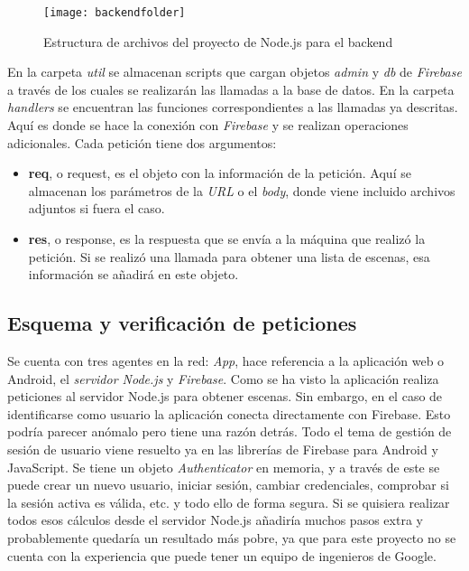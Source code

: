 \begin{figure}[h]
    \centering
    \texttt{[image: backendfolder]}
    \caption[Estructura de archivos de backend]{Estructura de archivos del proyecto de Node.js para el backend}
\end{figure}

En la carpeta \textit{util} se almacenan scripts que cargan objetos \textit{admin} y \textit{db} de \textit{Firebase} a través de los cuales se realizarán las llamadas a la base de datos. En la carpeta \textit{handlers} se encuentran las funciones correspondientes a las llamadas ya descritas. Aquí es donde se hace la conexión con \textit{Firebase} y se realizan operaciones adicionales. Cada petición tiene dos argumentos:

\begin{itemize}
    \item \textbf{req}, o request, es el objeto con la información de la petición. Aquí se almacenan los parámetros de la \textit{URL} o el \textit{body}, donde viene incluido archivos adjuntos si fuera el caso.
    \item \textbf{res}, o response, es la respuesta que se envía a la máquina que realizó la petición. Si se realizó una llamada para obtener una lista de escenas, esa información se añadirá en este objeto.
\end{itemize}

\subsection{Esquema y verificación de peticiones}

Se cuenta con tres agentes en la red: \textit{App}, hace referencia a la aplicación web o Android, el \textit{servidor Node.js} y \textit{Firebase}. Como se ha visto la aplicación realiza peticiones al servidor Node.js para obtener escenas. Sin embargo, en el caso de identificarse como usuario la aplicación conecta directamente con Firebase. Esto podría parecer anómalo pero tiene una razón detrás. Todo el tema de gestión de sesión de usuario viene resuelto ya en las librerías de Firebase para Android y JavaScript. Se tiene un objeto \textit{Authenticator} en memoria, y a través de este se puede crear un nuevo usuario, iniciar sesión, cambiar credenciales, comprobar si la sesión activa es válida, etc. y todo ello de forma segura. Si se quisiera realizar todos esos cálculos desde el servidor Node.js añadiría muchos pasos extra y probablemente quedaría un resultado más pobre, ya que para este proyecto no se cuenta con la experiencia que puede tener un equipo de ingenieros de Google.

